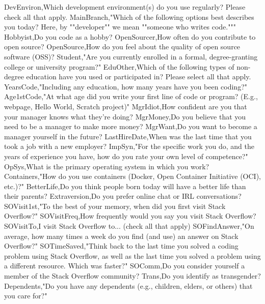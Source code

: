 \begin{appendices}
    DevEnviron,Which development environment(s) do you use regularly?  Please check all that apply.
    MainBranch,"Which of the following options best describes you today? Here, by ""developer"" we mean ""someone who writes code."""
    Hobbyist,Do you code as a hobby?
    OpenSourcer,How often do you contribute to open source?
    OpenSource,How do you feel about the quality of open source software (OSS)?
    Student,"Are you currently enrolled in a formal, degree-granting college or university program?"
    EduOther,Which of the following types of non-degree education have you used or participated in? Please select all that apply.
    YearsCode,"Including any education, how many years have you been coding?"
    Age1stCode,"At what age did you write your first line of code or program? (E.g., webpage, Hello World, Scratch project)"
    MgrIdiot,How confident are you that your manager knows what they’re doing?
    MgrMoney,Do you believe that you need to be a manager to make more money?
    MgrWant,Do you want to become a manager yourself in the future?
    LastHireDate,When was the last time that you took a job with a new employer?
    ImpSyn,"For the specific work you do, and the years of experience you have, how do you rate your own level of competence?"
    OpSys,What is the primary operating system in which you work?
    Containers,"How do you use containers (Docker, Open Container Initiative (OCI), etc.)?"
    BetterLife,Do you think people born today will have a better life than their parents?
    Extraversion,Do you prefer online chat or IRL conversations?
    SOVisit1st,"To the best of your memory, when did you first visit Stack Overflow?"
    SOVisitFreq,How frequently would you say you visit Stack Overflow?
    SOVisitTo,I visit Stack Overflow to... (check all that apply)
    SOFindAnswer,"On average, how many times a week do you find (and use) an answer on Stack Overflow?"
    SOTimeSaved,"Think back to the last time you solved a coding problem using Stack Overflow, as well as the last time you solved a problem using a different resource. Which was faster?"
    SOComm,Do you consider yourself a member of the Stack Overflow community?
    Trans,Do you identify as transgender?
    Dependents,"Do you have any dependents (e.g., children, elders, or others) that you care for?"



\end{appendices}
